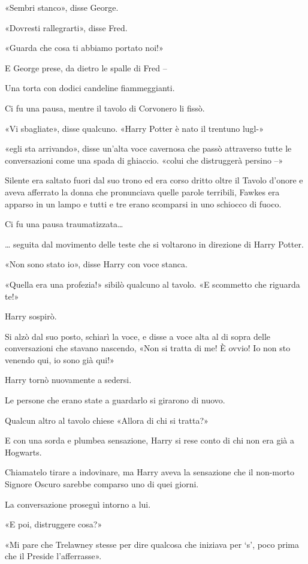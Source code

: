 «Sembri stanco», disse George.

«Dovresti rallegrarti», disse Fred.

«Guarda che cosa ti abbiamo portato noi!»

E George prese, da dietro le spalle di Fred –

Una torta con dodici candeline fiammeggianti.

Ci fu una pausa, mentre il tavolo di Corvonero li fissò.

«Vi sbagliate», disse qualcuno. «Harry Potter è nato il trentuno lugl-»

«egli sta arrivando», disse un’alta voce cavernosa che passò attraverso tutte le conversazioni come una spada di ghiaccio. «colui che distruggerà persino –»

Silente era saltato fuori dal suo trono ed era corso dritto oltre il Tavolo d’onore e aveva afferrato la donna che pronunciava quelle parole terribili, Fawkes era apparso in un lampo e tutti e tre erano scomparsi in uno schiocco di fuoco.

Ci fu una pausa traumatizzata…

… seguita dal movimento delle teste che si voltarono in direzione di Harry Potter.

«Non sono stato io», disse Harry con voce stanca.

«Quella era una profezia!» sibilò qualcuno al tavolo. «E scommetto che riguarda te!»

Harry sospirò.

Si alzò dal suo posto, schiarì la voce, e disse a voce alta al di sopra delle conversazioni che stavano nascendo, «Non si tratta di me! È ovvio! Io non sto venendo qui, io sono già qui!»

Harry tornò nuovamente a sedersi.

Le persone che erano state a guardarlo si girarono di nuovo.

Qualcun altro al tavolo chiese «Allora di chi si tratta?»

E con una sorda e plumbea sensazione, Harry si rese conto di chi non era già a Hogwarts.

Chiamatelo tirare a indovinare, ma Harry aveva la sensazione che il non-morto Signore Oscuro sarebbe comparso uno di quei giorni.

La conversazione proseguì intorno a lui.

«E poi, distruggere cosa?»

«Mi pare che Trelawney stesse per dire qualcosa che iniziava per ‘s’, poco prima che il Preside l’afferrasse».

